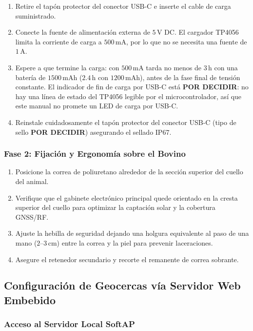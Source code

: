 \begin{enumerate}[leftmargin=*]
    \item Retire el tapón protector del conector USB-C e inserte el cable de carga suministrado.
    \item Conecte la fuente de alimentación externa de $5\,\text{V DC}$. El cargador TP4056 limita la corriente de carga a $500\,\text{mA}$, por lo que no se necesita una fuente de $1\,\text{A}$.
    \item Espere a que termine la carga: con $500\,\text{mA}$ tarda no menos de $3\,\text{h}$ con una batería de $1500\,\text{mAh}$ ($2.4\,\text{h}$ con $1200\,\text{mAh}$), antes de la fase final de tensión constante. El indicador de fin de carga por USB-C está \textbf{POR DECIDIR}: no hay una línea de estado del TP4056 legible por el microcontrolador, así que este manual no promete un LED de carga por USB-C.
    \item Reinstale cuidadosamente el tapón protector del conector USB-C (tipo de sello \textbf{POR DECIDIR}) asegurando el sellado IP67.
\end{enumerate}

\subsubsection{Fase 2: Fijación y Ergonomía sobre el Bovino}

\begin{enumerate}[leftmargin=*]
    \item Posicione la correa de poliuretano alrededor de la sección superior del cuello del animal.
    \item Verifique que el gabinete electrónico principal quede orientado en la cresta superior del cuello para optimizar la captación solar y la cobertura GNSS/RF.
    \item Ajuste la hebilla de seguridad dejando una holgura equivalente al paso de una mano ($2\text{--}3\,\text{cm}$) entre la correa y la piel para prevenir laceraciones.
    \item Asegure el retenedor secundario y recorte el remanente de correa sobrante.
\end{enumerate}

\subsection{Configuración de Geocercas vía Servidor Web Embebido}

\subsubsection{Acceso al Servidor Local SoftAP}

